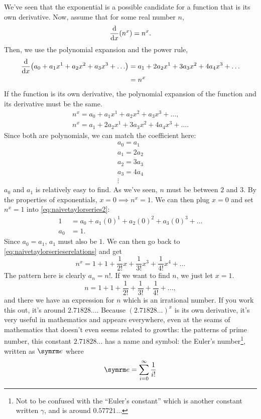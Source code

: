 We've seen that the exponential is a possible candidate for a function that is its own derivative. Now, assume that for some real number $n$,
\begin{equation}
    \dv{x}(n^x) = n^x.
\end{equation}
Then, we use the polynomial expansion and the power rule,
\begin{align*}
    \dv{x}(a_0 + a_1x^1 + a_2x^2 + a_3x^3 + \dots) &= a_1 + 2a_2x^1 + 3a_3x^2 + 4a_4x^3 + \dots \\
    &= n^x
\end{align*}
If the function is its own derivative, the polynomial expansion of the function and its derivative must be the same.
\begin{gather}
    n^x = a_0 + a_1x^1 + a_2x^2 + a_3x^3 + \dots, \label{eq:naivetaylorseries1}\\
    n^x = a_1 + 2a_2x^1 + 3a_3x^2 + 4a_4x^3 + \dots. \label{eq:naivetaylorseries2}
\end{gather}
Since both are polynomials, we can match the coefficient here:
\begin{equation}
    \begin{array}{c}
    a_0 = a_1 \\ a_1 = 2a_2 \\ a_2 = 3a_3 \\ a_3 = 4a_4 \\ \vdots
    \end{array}\label{eq:naivetaylorserieserelations}
\end{equation}
$a_0$ and $a_1$ is relatively easy to find. As we've seen, $n$ must be between $2$ and $3$. By the properties of exponentials, $x = 0 \implies n^x = 1$. We can then plug $x = 0$ and set $n^x = 1$ into \cref{eq:naivetaylorseries2}:
\begin{align*}
    1 &= a_0 + a_1(0)^1 + a_2(0)^2 + a_3(0)^3 + \dots \\
    a_0 &= 1.
\end{align*}
Since $a_0 = a_1$, $a_1$ must also be $1$. We can then go back to \cref{eq:naivetaylorserieserelations} and get
\begin{equation*}
    n^x = 1 + 1 + \frac{1}{2!}x + \frac{1}{3!}x^3 + \frac{1}{4!}x^4 + \dots
\end{equation*}
The pattern here is clearly $a_n = n!$. If we want to find $n$, we just let $x = 1$.
\begin{equation*}
    n = 1 + 1 + \frac{1}{2!} + \frac{1}{3!} + \frac{1}{4!} + \dots,
\end{equation*}
and there we have an expression for $n$ which is an irrational number. If you work this out, it's around $2.71828\dots$. Because $(2.71828\dots)^x$ is its own derivative, it's very useful in mathematics and appears everywhere, even at the seams of mathematics that doesn't even seems related to growths: the patterns of prime number, this constant $2.71828\dotso$ has a name and symbol: the Euler's number\footnote{Not to be confused with the ``Euler's constant'' which is another constant written $\gamma$, and is around $0.57721\dots$}, written as $\e$ where
\begin{equation}
    \e = \sum_{i = 0}^{\infty}\frac{1}{i!}
\end{equation}

